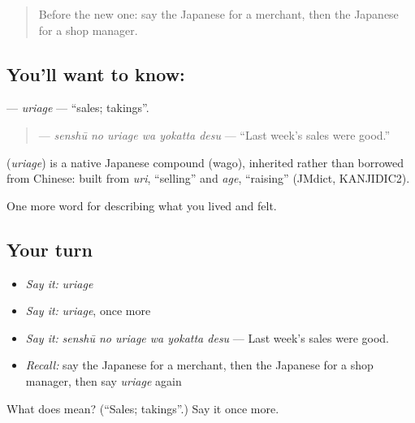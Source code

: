 \begin{quote}
Before the new one: say the Japanese for a merchant, then the Japanese for a shop manager.
\end{quote}

\subsection*{You'll want to know: }
\textbf{} — \emph{uriage} — \textquotedblleft{}sales; takings\textquotedblright{}.

\begin{quote}
\textbf{  } — \emph{senshū no uriage wa yokatta desu} — \textquotedblleft{}Last week's sales were good.\textquotedblright{}
\end{quote}

\begin{cousinweb}
\textbf{} (\emph{uriage}) is a native Japanese compound (wago), inherited rather than borrowed from Chinese: built from \emph{uri}, \textquotedblleft{}selling\textquotedblright{} and \emph{age}, \textquotedblleft{}raising\textquotedblright{} (JMdict, KANJIDIC2).
\end{cousinweb}

\begin{grammarlens}[title={What you've built}]
One more word for describing what you lived and felt.
\end{grammarlens}

\subsection*{Your turn}
\begin{itemize}
\raggedright
  \item \emph{Say it:} \emph{uriage}
  \item \emph{Say it:} \emph{uriage}, once more
  \item \emph{Say it:} \emph{senshū no uriage wa yokatta desu} — Last week's sales were good.
  \item \emph{Recall:} say the Japanese for a merchant, then the Japanese for a shop manager, then say \emph{uriage} again
\end{itemize}

\begin{tcolorbox}[breakable,colback=teal!4,colframe=teal!35!black,title={Before you move on}]
What does  mean? (\textquotedblleft{}Sales; takings\textquotedblright{}.) Say it once more.
\end{tcolorbox}
